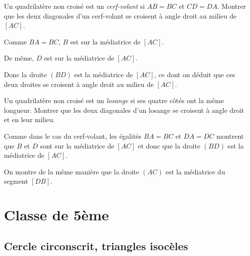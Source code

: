 \begin{exo}
Un quadrilatère non croisé est un \emph{cerf-volant} si $AB=BC$ et $CD=DA$. Montrer que les deux diagonales d'un cerf-volant se croisent à angle droit au milieu de $[AC]$.
\begin{sol}
Comme $BA=BC$, $B$ est sur la médiatrice de $[AC]$.

De même, $D$ est sur la médiatrice de $[AC]$.

Donc la droite $(BD)$ est la médiatrice de $[AC]$, ce dont on déduit que ces deux droites se croisent à angle droit au milieu de $[AC]$.
\end{sol}
\end{exo}

\begin{exo}[Losange]
Un quadrilatère non croisé est un \emph{losange} si ses quatre côtés ont la même longueur. Montrer que les deux diagonales d'un losange se croisent à angle droit et en leur milieu.
\begin{sol}
Comme dans le cas du cerf-volant, les égalités $BA=BC$ et $DA=DC$ montrent que $B$ et $D$ sont sur la médiatrice de $[AC]$ et donc que la droite $(BD)$ est la médiatrice de $[AC]$.

On montre de la même manière que la droite $(AC)$ est la médiatrice du segment $[DB]$.
\end{sol}
\end{exo}





\section{Classe de 5ème}



\subsection{Cercle circonscrit, triangles isocèles}



